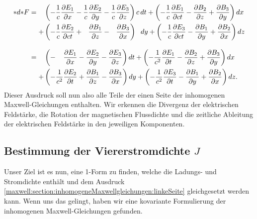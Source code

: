 \begin{align}
	\ast d {\ast} F 
	= 
	\phantom{+} &\left( -\frac{1}{c}\frac{\partial E_1}{\partial x} -\frac{1}{c}\frac{\partial E_2}{\partial y} - \frac{1}{c}\frac{\partial E_3}{\partial z} \right) c \, dt +
	\left(-\frac{1}{c}\frac{\partial E_1}{\partial ct} - \frac{\partial B_2}{\partial z} + \frac{\partial B_3}{\partial y} \right) dx \notag
	\\
	+ &\left( -\frac{1}{c}\frac{\partial E_2}{\partial ct} + \phantom{\frac{1}{c}} \frac{\partial B_1}{\partial z} - \phantom{\frac{1}{c}} \frac{\partial B_3}{\partial x} \right) \phantom{c \,}dy +
	\left( -\frac{1}{c}\frac{\partial E_3}{\partial ct} - \frac{\partial B_1}{\partial y} + \frac{\partial B_2}{\partial x} \right) dz \notag
	\\[2ex]
	=
	\phantom{+} &\left( -\phantom{\frac{1}{c^2}}\frac{\partial E_1}{\partial x} -\frac{\partial E_2}{\partial y} - \frac{\partial E_3}{\partial z} \right) dt +
	\left(-\frac{1}{c^2}\frac{\partial E_1}{\partial t} - \frac{\partial B_2}{\partial z} + \frac{\partial B_3}{\partial y} \right) dx
	\label{maxwell:section:inhomogeneMaxwellgleichungen:linkeSeite}
	\\
	+ &\left( -\frac{1}{c^2}\frac{\partial E_2}{\partial t} + \frac{\partial B_1}{\partial z} - \frac{\partial B_3}{\partial x} \right) dy +
	\left( -\frac{1}{c^2}\frac{\partial E_3}{\partial t} - \frac{\partial B_1}{\partial y} + \frac{\partial B_2}{\partial x} \right) dz. \notag
\end{align}
Dieser Ausdruck soll nun also alle Teile der einen Seite der inhomogenen Maxwell-Gleichungen enthalten.
Wir erkennen die Divergenz der elektrischen Feldstärke, die Rotation der magnetischen Flussdichte und die zeitliche Ableitung der elektrischen Feldstärke in den jeweiligen Komponenten.
\subsection{Bestimmung der Viererstromdichte $J$}

Unser Ziel ist es nun, eine 1-Form zu finden, welche die Ladungs- und Stromdichte enthält und dem Ausdruck \eqref{maxwell:section:inhomogeneMaxwellgleichungen:linkeSeite} gleichgesetzt werden kann.
Wenn uns das gelingt, haben wir eine kovariante Formulierung der inhomogenen Maxwell-Gleichungen gefunden.

